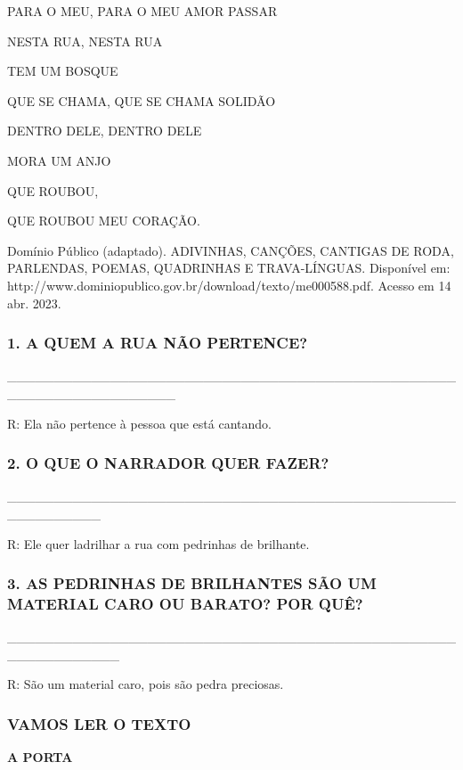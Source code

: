 PARA O MEU, PARA O MEU AMOR PASSAR

NESTA RUA, NESTA RUA

TEM UM BOSQUE

QUE SE CHAMA, QUE SE CHAMA SOLIDÃO 

DENTRO DELE, DENTRO DELE

MORA UM ANJO 

QUE ROUBOU, 

QUE ROUBOU MEU CORAÇÃO.

Domínio Público (adaptado). ADIVINHAS, CANÇÕES, CANTIGAS DE RODA, PARLENDAS, POEMAS, QUADRINHAS E TRAVA-LÍNGUAS. Disponível em: http://www.dominiopublico.gov.br/download/texto/me000588.pdf. Acesso em 14 abr. 2023.

\subsubsection{1. A QUEM A RUA NÃO PERTENCE?
}

\_\_\_\_\_\_\_\_\_\_\_\_\_\_\_\_\_\_\_\_\_\_\_\_\_\_\_\_\_\_\_\_\_\_\_\_\_\_\_\_\_\_\_\_\_\_\_\_\_\_\_\_\_\_\_\_\_\_\_\_\_\_\_\_\_\_

R: Ela não pertence à pessoa que está cantando.

\subsubsection{2. O QUE O NARRADOR QUER FAZER?}

\_\_\_\_\_\_\_\_\_\_\_\_\_\_\_\_\_\_\_\_\_\_\_\_\_\_\_\_\_\_\_\_\_\_\_\_\_\_\_\_\_\_\_\_\_\_\_\_\_\_\_\_\_\_\_\_\_\_

R: Ele quer ladrilhar a rua com pedrinhas de brilhante.

\subsubsection{3.  AS PEDRINHAS DE BRILHANTES SÃO UM MATERIAL CARO OU BARATO? POR QUÊ?}

\_\_\_\_\_\_\_\_\_\_\_\_\_\_\_\_\_\_\_\_\_\_\_\_\_\_\_\_\_\_\_\_\_\_\_\_\_\_\_\_\_\_\_\_\_\_\_\_\_\_\_\_\_\_\_\_\_\_\_\_

R: São um material caro, pois são pedra preciosas.

\subsubsection{VAMOS LER O TEXTO}\label{vamos-ler-o-texto}

\textbf{A PORTA}

